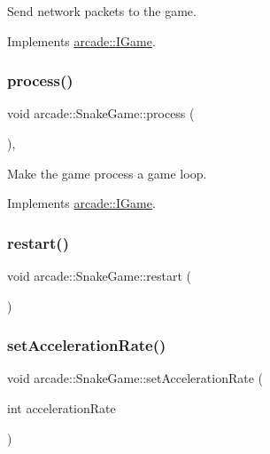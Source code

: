 Send network packets to the game. 



Implements \hyperlink{classarcade_1_1_i_game_aaf375290947abf3db32d966facbfacf3}{arcade\+::\+I\+Game}.

\mbox{\label{classarcade_1_1_snake_game_a8a04d76c02f814a01a27f394775ea2f7}} 
\subsubsection{\texorpdfstring{process()}{process()}}
{\footnotesize\ttfamily void arcade\+::\+Snake\+Game\+::process (\begin{DoxyParamCaption}{ }\end{DoxyParamCaption})\hspace{0.3cm}{\ttfamily [override]}, {\ttfamily [virtual]}}



Make the game process a game loop. 



Implements \hyperlink{classarcade_1_1_i_game_af0111a41083f38a1af1a7f94287e6e77}{arcade\+::\+I\+Game}.

\mbox{\label{classarcade_1_1_snake_game_a508e4f2107e92ff4648254ff421bf1f6}} 
\subsubsection{\texorpdfstring{restart()}{restart()}}
{\footnotesize\ttfamily void arcade\+::\+Snake\+Game\+::restart (\begin{DoxyParamCaption}{ }\end{DoxyParamCaption})}

\mbox{\label{classarcade_1_1_snake_game_a72ed46dfc25cd85c27277705bd93166a}} 
\subsubsection{\texorpdfstring{set\+Acceleration\+Rate()}{setAccelerationRate()}}
{\footnotesize\ttfamily void arcade\+::\+Snake\+Game\+::set\+Acceleration\+Rate (\begin{DoxyParamCaption}\item[{int}]{acceleration\+Rate }\end{DoxyParamCaption})}

